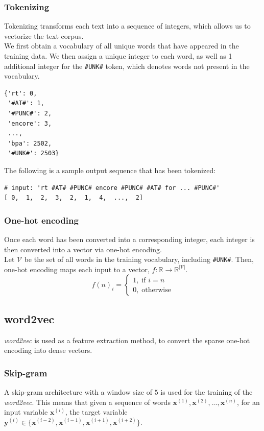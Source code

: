 \documentclass{article}
\numberwithin{equation}{section}
\begin{document}
\subsubsection{Tokenizing}
Tokenizing transforms each text into a sequence of integers, which allows us to vectorize the text corpus.\\

We first obtain a vocabulary of all unique words that have appeared in the training data.  We then assign a unique integer to each word, as well as 1 additional integer for the \lstinline{#UNK#} token, which denotes words not present in the vocabulary.

\begin{verbatim}
{'rt': 0,
 '#AT#': 1,
 '#PUNC#': 2,
 'encore': 3,
 ...,
 'bpa': 2502,
 '#UNK#': 2503}
\end{verbatim}

The following is a sample output sequence that has been tokenized:
\begin{verbatim}
# input: 'rt #AT# #PUNC# encore #PUNC# #AT# for ... #PUNC#'
[ 0,  1,  2,  3,  2,  1,  4,  ...,  2]
\end{verbatim}

\subsubsection{One-hot encoding}
Once each word has been converted into a corresponding integer, each integer is then converted into a vector via one-hot encoding.\\

Let $\mathcal{V}$ be the set of all words in the training vocabulary, including \lstinline{#UNK#}. Then, one-hot encoding maps each input to a vector, $f: \mathbb{R} \rightarrow \mathbb{R}^{|\mathcal{V}|}$.
	$$ f(n)_i = \left\{\begin{matrix}
	1, \; \text{if } i=n\\
	0, \; \text{otherwise}
	\end{matrix}\right. $$

\subsection{word2vec}
\emph{word2vec} is used as a feature extraction method, to convert the sparse one-hot encoding into dense vectors.

\subsubsection{Skip-gram}
A skip-gram architecture with a window size of $5$ is used for the training of the \emph{word2vec}. This means that given a sequence of words $\bm{x}^{(1)}, \bm{x}^{(2)}, ..., \bm{x}^{(n)}$, for an input variable $\bm{x}^{(i)}$, the target variable $\bm{y}^{(i)} \in \{\bm{x}^{(i-2)}, \bm{x}^{(i-1)}, \bm{x}^{(i+1)}, \bm{x}^{(i+2)}\}$.\\
\end{document}
